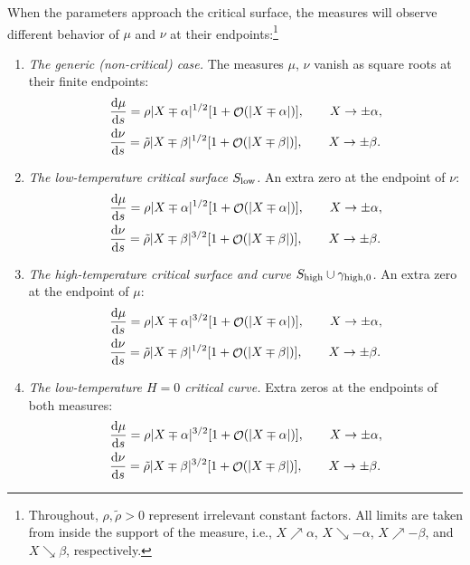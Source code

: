 \documentclass[pdftex]{sigma}
\DeclareMathOperator{\OO}{\mathcal{O}}
\numberwithin{equation}{section}
\begin{document}
When the parameters approach the critical surface, the measures will observe different behavior of $\mu$ and $\nu$ at their endpoints:\footnote{Throughout, $\rho,\tilde{\rho} > 0$ represent irrelevant constant factors. All limits
 are taken from inside the support of the measure, i.e., $X\nearrow \alpha$, $X\searrow -\alpha$, $X\nearrow -\beta$, and $X\searrow \beta$, respectively.}
\begin{enumerate}\itemsep=0pt
 \item \textit{The generic (non-critical) case.} %
 The measures $\mu$, $\nu$ vanish as square roots
 at their finite endpoints:
 \begin{align*}
 &\frac{{\rm d}\mu}{{\rm d}s}= \rho |X\mp\alpha|^{1/2}[1 + \OO(|X\mp\alpha|)], \qquad X\to \pm\alpha,\\
 &\frac{{\rm d}\nu}{{\rm d}s}= \tilde{\rho} |X\mp\beta|^{1/2}[1 + \OO(|X\mp\beta|)], \qquad X\to \pm\beta.
 \end{align*}
 \item \textit{The low-temperature critical surface $S_{{\rm low}}$.}
 An extra zero at the endpoint of $\nu$:
 \begin{align*}
 &\frac{{\rm d}\mu}{{\rm d}s}= \rho |X\mp\alpha|^{1/2}[1 + \OO(|X\mp\alpha|)], \qquad X\to \pm\alpha,\\
 &\frac{{\rm d}\nu}{{\rm d}s}= \tilde{\rho} |X\mp\beta|^{3/2}[1 + \OO(|X\mp\beta|)], \qquad X\to \pm\beta.
 \end{align*}
 \item \textit{The high-temperature critical surface and curve $S_{{\rm high}} \cup\gamma_{{\rm high},0}$.}
 An extra zero at the endpoint
 of $\mu$:
 \begin{align*}
 &\frac{{\rm d}\mu}{{\rm d}s}= \rho |X\mp\alpha|^{3/2}[1 + \OO(|X\mp\alpha|)], \qquad X\to \pm\alpha,\\
 &\frac{{\rm d}\nu}{{\rm d}s}= \tilde{\rho} |X\mp\beta|^{1/2}[1 + \OO(|X\mp\beta|)], \qquad X\to \pm\beta.
 \end{align*}
 \item \textit{The low-temperature $H=0$ critical curve.}
 Extra zeros at the endpoints of both measures:
 \begin{align*}
 &\frac{{\rm d}\mu}{{\rm d}s}= \rho |X\mp\alpha|^{3/2}[1 + \OO(|X\mp\alpha|)], \qquad X\to \pm\alpha,\\
 &\frac{{\rm d}\nu}{{\rm d}s}= \tilde{\rho} |X\mp\beta|^{3/2}[1 + \OO(|X\mp\beta|)], \qquad X\to \pm\beta.

\end{align*}
\end{enumerate}
\end{document}
